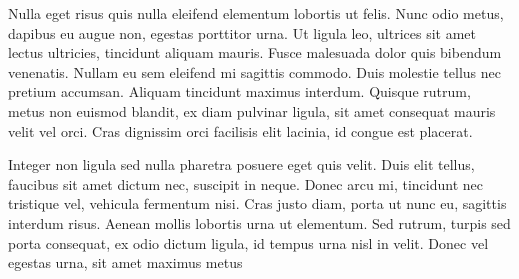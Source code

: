 \documentclass[
  a5paper,
  smalldemyvopaper,10pt,twoside,onecolumn,openright,extrafontsizes,hidelinks]{memoir}
\begin{document}
Nulla eget risus quis nulla eleifend elementum lobortis ut felis. Nunc
odio metus, dapibus eu augue non, egestas porttitor urna. Ut ligula leo,
ultrices sit amet lectus ultricies, tincidunt aliquam mauris. Fusce
malesuada dolor quis bibendum venenatis. Nullam eu sem eleifend mi
sagittis commodo. Duis molestie tellus nec pretium accumsan. Aliquam
tincidunt maximus interdum. Quisque rutrum, metus non euismod blandit,
ex diam pulvinar ligula, sit amet consequat mauris velit vel orci. Cras
dignissim orci facilisis elit lacinia, id congue est placerat.

Integer non ligula sed nulla pharetra posuere eget quis velit. Duis elit
tellus, faucibus sit amet dictum nec, suscipit in neque. Donec arcu mi,
tincidunt nec tristique vel, vehicula fermentum nisi. Cras justo diam,
porta ut nunc eu, sagittis interdum risus. Aenean mollis lobortis urna
ut elementum. Sed rutrum, turpis sed porta consequat, ex odio dictum
ligula, id tempus urna nisl in velit. Donec vel egestas urna, sit amet
maximus metus


\backmatter
\end{document}
